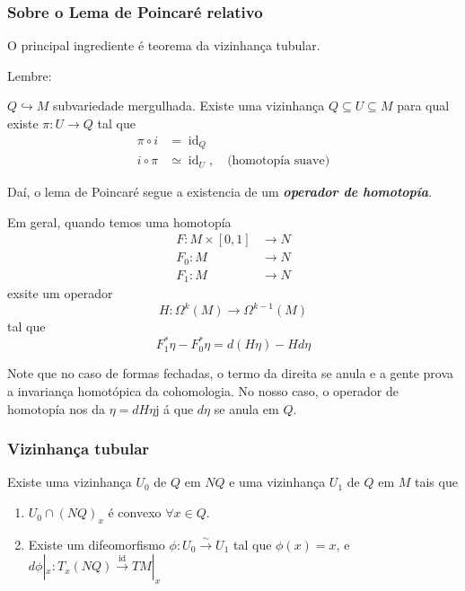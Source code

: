 \subsubsection{Sobre o Lema de Poincar\'e relativo}

O principal ingrediente \'e teorema da vizinhança tubular.

Lembre:

\begin{thm}
	$Q\hookrightarrow M$ subvariedade mergulhada. Existe uma vizinhança $Q\subseteq U\subseteq M$ para qual existe $\pi:U\to Q$ tal que 
	\begin{align*}
		\pi\circ i&=\operatorname{id}_Q\\
		i\circ \pi&\simeq \operatorname{id}_U, \quad \text{(homotop\'ia suave)} 
	\end{align*}
\end{thm}

Da\'i, o lema de Poincar\'e segue a existencia de um \textit{\textbf{operador de homotop\'ia}}.

Em geral, quando temos uma homotop\'ia
\begin{align*}
	F: M\times [0,1] &\longrightarrow N \\
	F_0 :M&\to N\\
	F_1:M&\to N
\end{align*}
exsite um operador 
\[H:\Omega^{k}(M) \to \Omega^{k-1}(M)\]
tal que
\[F_1^*\eta-F^*_0\eta=d(H\eta)-Hd\eta\]

Note que no caso de formas fechadas, o termo da direita se anula e a gente prova a invariança homot\'opica da cohomologia. No nosso caso, o operador de homotop\'ia nos da $\eta=dH\eta$j \'a que $d\eta$ se anula em  $Q$.

\subsubsection{Vizinhança tubular}

\begin{thm}
	Existe uma vizinhança $U_0$ de $Q$ em $NQ$ e uma vizinhança $U_1$ de $Q$ em $M$ tais que
	\begin{enumerate}[label=\alph*.]
		\item $U_0\cap (NQ)_x$ \'e convexo $\forall x\in Q$.

		\item Existe um difeomorfismo  $\phi:U_0\overset{\sim}{\longrightarrow} U_1$ tal que $\phi(x)=x$, e $d\phi|_{x}:T_x(NQ)\overset{\operatorname{id}}{\longrightarrow}TM|_{x}$
	\end{enumerate}
\end{thm}


